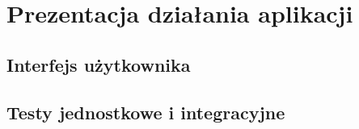\chapter{Prezentacja działania aplikacji}
\label{cha:prezentacja}


\section{Interfejs użytkownika}
\label{sec:interfejsUzytkownika}


\section{Testy jednostkowe i integracyjne}
\label{sec:testyJednostkoweIntegracyjne}
